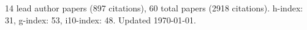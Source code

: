 14 lead author papers (897 citations),
60 total papers (2918 citations).\newline
h-index: 31, g-index: 53, i10-index: 48. Updated \today.